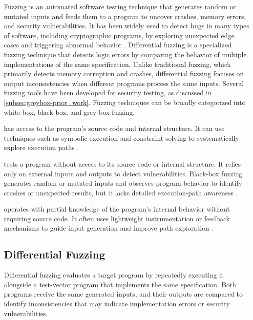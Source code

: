 Fuzzing is an automated software testing technique that generates random or mutated inputs and feeds them to a program to uncover crashes, memory errors, and security vulnerabilities. It has been widely used to detect bugs in many types of software, including cryptographic programs, by exploring unexpected edge cases and triggering abnormal behavior \cite{aflplusplus_afl_fuzz_approach, google_fuzzing_docs}. Differential fuzzing is a specialized fuzzing technique that detects logic errors by comparing the behavior of multiple implementations of the same specification. Unlike traditional fuzzing, which primarily detects memory corruption and crashes, differential fuzzing focuses on output inconsistencies when different programs process the same inputs. Several fuzzing tools have been developed for security testing, as discussed in \autoref{subsec:greybox-prior_work}. Fuzzing techniques can be broadly categorized into white-box, black-box, and grey-box fuzzing.

 has access to the program's source code and internal structure. It can use techniques such as symbolic execution and constraint solving to systematically explore execution paths \cite{godefroid2007random}.

 tests a program without access to its source code or internal structure. It relies only on external inputs and outputs to detect vulnerabilities. Black-box fuzzing generates random or mutated inputs and observes program behavior to identify crashes or unexpected results, but it lacks detailed execution-path awareness \cite{godefroid2007random}.

 operates with partial knowledge of the program's internal behavior without requiring source code. It often uses lightweight instrumentation or feedback mechanisms to guide input generation and improve path exploration \cite{wang2020sok}.

\subsection{Differential Fuzzing}
Differential fuzzing evaluates a target program by repeatedly executing it alongside a test-vector program that implements the same specification. Both programs receive the same generated inputs, and their outputs are compared to identify inconsistencies that may indicate implementation errors or security vulnerabilities.

